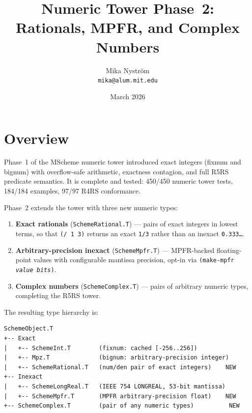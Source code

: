 \documentclass[12pt]{article}
\title{\bfseries\sffamily\fontsize{24.88}{30}\selectfont
  Numeric Tower Phase~2:\\Rationals, MPFR, and Complex Numbers}
\author{Mika Nystr\"om \\ {\tt mika@alum.mit.edu}}
\date{March 2026}
\begin{document}
\maketitle
\thispagestyle{empty}

\newpage
\tableofcontents
\newpage

\section{Overview}
\label{sec:overview}

Phase~1 of the MScheme numeric tower introduced exact integers
(fixnum and bignum) with overflow-safe arithmetic, exactness
contagion, and full R5RS predicate semantics.  It is complete and
tested: 450/450 numeric tower tests, 184/184 examples, 97/97 R4RS
conformance.

Phase~2 extends the tower with three new numeric types:
\begin{enumerate}[nosep]
\item \textbf{Exact rationals} ({\tt SchemeRational.T}) ---
  pairs of exact integers in lowest terms, so that {\tt (/ 1 3)}
  returns an exact {\tt 1/3} rather than an inexact {\tt 0.333\ldots}.
\item \textbf{Arbitrary-precision inexact} ({\tt SchemeMpfr.T}) ---
  MPFR-backed floating-point values with configurable mantissa
  precision, opt-in via {\tt (make-mpfr \emph{value} \emph{bits})}.
\item \textbf{Complex numbers} ({\tt SchemeComplex.T}) ---
  pairs of arbitrary numeric types, completing the R5RS tower.
\end{enumerate}

\noindent The resulting type hierarchy is:
\begin{lstlisting}[language={},frame=none,backgroundcolor=\color{white},xleftmargin=4em]
SchemeObject.T
+-- Exact
|   +-- SchemeInt.T        (fixnum: cached [-256..256])
|   +-- Mpz.T              (bignum: arbitrary-precision integer)
|   +-- SchemeRational.T   (num/den pair of exact integers)    NEW
+-- Inexact
|   +-- SchemeLongReal.T   (IEEE 754 LONGREAL, 53-bit mantissa)
|   +-- SchemeMpfr.T       (MPFR arbitrary-precision float)    NEW
+-- SchemeComplex.T        (pair of any numeric types)          NEW
\end{lstlisting}

\end{document}
